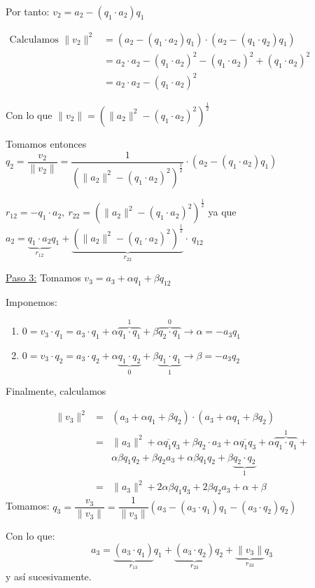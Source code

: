 \documentclass[12pt]{article}
\begin{document}
Por tanto: $v_2=a_2-(q_1\cdot a_2)q_1$

$\begin{array}{rl}
\text{Calculamos }\|v_2\|^2 & =(a_2-(q_1\cdot a_2)q_1)\cdot(a_2-(q_1\cdot q_2)q_1)\\
 & =a_2\cdot a_2-(q_1\cdot a_2)^2-(q_1\cdot a_2)^2+(q_1\cdot a_2)^2\\
 & =a_2\cdot a_2-(q_1\cdot a_2)^2
\end{array}$

Con lo que $\|v_2\|=\left(\|a_2\|^2-(q_1\cdot a_2)^2\right)^{\frac{1}{2}}$

Tomamos entonces $q_2=\dfrac{v_2}{\|v_2\|}=\dfrac{1}{\left(\|a_2\|^2-(q_1\cdot a_2)^2\right)^{\frac{1}{2}}}\cdot\left(a_2-(q_1\cdot a_2)q_1\right)$

$r_{12}=-q_1\cdot a_2,~r_{22}=\left(\|a_2\|^2-(q_1\cdot a_2)^2\right)^{\frac{1}{2}}$ ya que $a_2=\underbrace{q_1\cdot a_2}_{r_{12}}q_1+\underbrace{\left(\|a_2\|^2-(q_1\cdot a_2)^2\right)^{\frac{1}{2}}}_{r_{22}}\cdot~q_{12}$

\underline{Paso 3:} Tomamos $v_3=a_3+\alpha q_1+\beta q_{12}$

Imponemos: 
\begin{enumerate}[label=\alph*)]
\item $0=v_3\cdot q_1=a_3\cdot q_1+\alpha\overbrace{q_1\cdot q_1}^{1}+\beta\overbrace{q_2\cdot q_1}^{0}\longrightarrow \alpha=-a_3q_1$
\item $0=v_3\cdot q_2=a_3\cdot q_2+\alpha\underbrace{q_1\cdot q_2}_{0}+\beta\underbrace{q_1\cdot q_1}_1\longrightarrow\beta=-a_3q_2$
\end{enumerate}
Finalmente, calculamos 

$$
\begin{array}{rcl}
\|v_3\|^2 & = &(a_3+\alpha q_1+\beta q_2)\cdot(a_3+\alpha q_1+\beta q_2)\\
 &=&\|a_3\|^2+\overline{\alpha q_1q_3}+\beta q_2\cdot a_3+\overline{\alpha q_1 q_3}+\alpha\overbrace{q_1\cdot q_1}^1+\\
 & &\alpha\beta q_1q_2+\beta q_2a_3+\alpha\beta q_1q_2+\beta\underbrace{q_2\cdot q_2}_1\\
 & =& \|a_3\|^2+2\alpha\beta q_1q_3+2\beta q_2a_3+\alpha+\beta
\end{array}
$$
Tomamos: $q_3=\dfrac{v_3}{\|v_3\|}=\dfrac{1}{\|v_3\|}\left(a_3-(a_3\cdot q_1)q_1-(a_3\cdot q_2)q_2\right)$

Con lo que: \[a_3=\underbrace{(a_3\cdot q_1)}_{r_{13}}q_1+\underbrace{(a_3\cdot q_2)}_{r_{23}}q_2+\underbrace{\|v_3\|}_{r_{33}}q_3\] y así sucesivamente.
\end{document}
